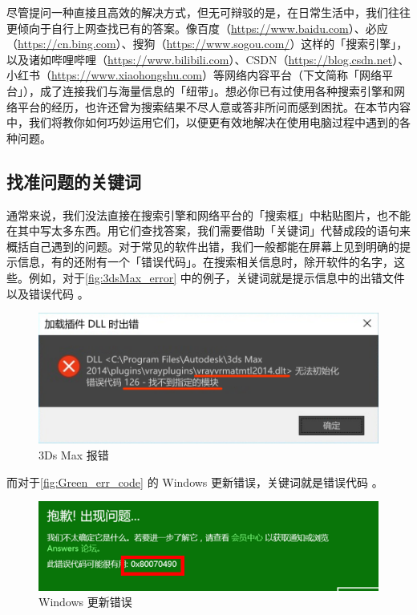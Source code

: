尽管提问一种直接且高效的解决方式，但无可辩驳的是，在日常生活中，我们往往更倾向于自行上网查找已有的答案。像百度（\url{https://www.baidu.com}）、必应（\url{https://cn.bing.com}）、搜狗（\url{https://www.sogou.com/}）这样的「搜索引擎」，以及诸如哔哩哔哩（\url{https://www.bilibili.com}）、CSDN（\url{https://blog.csdn.net}）、小红书（\url{https://www.xiaohongshu.com}）等网络内容平台（下文简称「网络平台」），成了连接我们与海量信息的「纽带」。想必你已有过使用各种搜索引擎和网络平台的经历，也许还曾为搜索结果不尽人意或答非所问而感到困扰。在本节内容中，我们将教你如何巧妙运用它们，以便更有效地解决在使用电脑过程中遇到的各种问题。

\subsection{找准问题的关键词}

通常来说，我们没法直接在搜索引擎和网络平台的「搜索框」中粘贴图片，也不能在其中写太多东西。用它们查找答案，我们需要借助「关键词」代替成段的语句来概括自己遇到的问题。对于常见的软件出错，我们一般都能在屏幕上见到明确的提示信息，有的还附有一个「错误代码」。在搜索相关信息时，除开软件的名字，这些。例如，对于\autoref{fig:3dsMax_error} 中的例子，关键词就是提示信息中的出错文件  以及错误代码 。

\begin{figure}[htb!]
  \centering
  \includegraphics[width=.7\textwidth]{assets/basic/3dsMax_error.png}
  \caption{3Ds Max 报错}
  \label{fig:3dsMax_error}
\end{figure}

而对于\autoref{fig:Green_err_code} 的 Windows 更新错误，关键词就是错误代码 。

\begin{figure}[htb!]
  \centering
  \includegraphics[width=.8\textwidth]{assets/basic/Green_err_code.png}
  \caption{Windows 更新错误}
  \label{fig:Green_err_code}
\end{figure}

